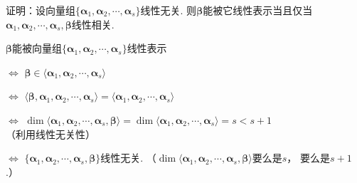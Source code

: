 \bigskip

\hypertarget{T1.7}{}
\begin{example}
    证明：设向量组$\{\bm{\alpha}_1 , \bm{\alpha}_2 , \cdots , \bm{\alpha}_s  \}$线性无关.
则$\bm{\beta}$能被它线性表示当且仅当$\bm{\alpha}_1 , \bm{\alpha}_2 , \cdots , \bm{\alpha}_s, \bm{\beta}$线性相关.
\end{example}
\smallskip
\begin{pf}
    $\bm{\beta}$能被向量组$\{\bm{\alpha}_1 , \bm{\alpha}_2 , \cdots , \bm{\alpha}_s  \}$线性表示

    $\Longleftrightarrow$
    $\bm{\beta} \in \langle \bm{\alpha}_1 , \bm{\alpha}_2 , \cdots , \bm{\alpha}_s  \rangle$

    $\Longleftrightarrow$
    $\langle \bm{\beta} , \bm{\alpha}_1 , \bm{\alpha}_2 , \cdots , \bm{\alpha}_s  \rangle 
    = \langle \bm{\alpha}_1 , \bm{\alpha}_2 , \cdots , \bm{\alpha}_s  \rangle$

    $\Longleftrightarrow$
    $\dim\langle \bm{\alpha}_1 , \bm{\alpha}_2 , \cdots , \bm{\alpha}_s, \bm{\beta}  \rangle 
    =\dim \langle \bm{\alpha}_1 , \bm{\alpha}_2 , \cdots , \bm{\alpha}_s  \rangle
    =s < s+1$ （利用线性无关性）

    $\Longleftrightarrow$
    $\{\bm{\alpha}_1 , \bm{\alpha}_2 , \cdots , \bm{\alpha}_s, \bm{\beta} \}$线性无关. 
    （$\dim \langle \bm{\alpha}_1 , \bm{\alpha}_2 , \cdots , \bm{\alpha}_s ,\bm{\beta} \rangle$要么是$s$，
    要么是$s+1$.）
\end{pf}

